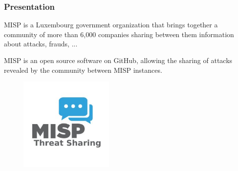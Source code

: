 \documentclass[12pt]{report}
\begin{document}
\subsubsection*{Presentation}
\begin{multicols}{2}

 MISP is a Luxembourg government organization that brings together a community of more than 6,000 companies sharing between them information about attacks, frauds, ... 

\setlength{\parskip}{0.0pt}

\setlength{\parskip}{8.04pt}
MISP is an open source software on GitHub, allowing the sharing of attacks revealed by the community between MISP instances.


\begin{figure}[H]
	\begin{FlushRight}		\includegraphics[width=1.82in,height=1.82in]{./media/image2.jpeg}
	\end{FlushRight}\end{figure}


\end{multicols}
\end{document}
